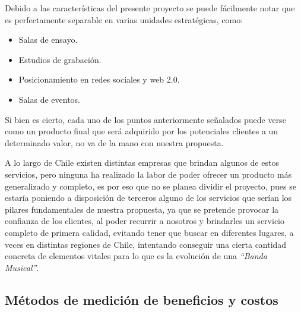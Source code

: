 Debido a las características del presente proyecto
se puede fácilmente notar que es perfectamente separable
en varias unidades estratégicas, como:

\begin{itemize}
	\item Salas de ensayo.
	\item Estudios de grabación.
	\item Posicionamiento en redes sociales y web 2.0.
	\item Salas de eventos.
\end{itemize}

Si bien es cierto,
cada uno de los puntos anteriormente señalados puede
verse como un producto final que será adquirido
por los potenciales clientes a un determinado
valor, no va de la mano con nuestra propuesta.

A lo largo de Chile existen distintas
empresas que brindan algunos de estos servicios,
pero ninguna ha realizado la labor de poder
ofrecer un producto más generalizado y completo,
es por eso que no se planea dividir el proyecto,
pues se estaría poniendo a disposición de terceros
alguno de los servicios que serían los pilares fundamentales
de nuestra propuesta, ya que se pretende provocar
la confianza de los clientes, al poder recurrir
a nosotros y brindarles un servicio completo
de primera calidad, evitando tener que buscar
en diferentes lugares, a veces en distintas regiones
de Chile, intentando conseguir  una cierta
cantidad concreta de elementos vitales
para lo que es la evolución de una \emph{``Banda Musical''}.

\subsection{Métodos de medición de beneficios y costos }

%

